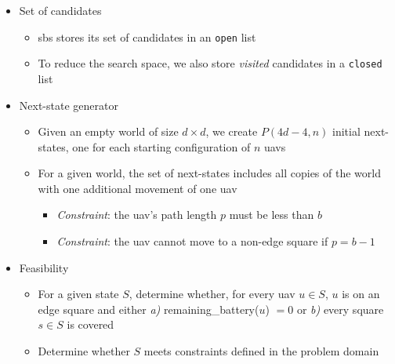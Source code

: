 \documentclass[../main.tex]{subfiles}
\begin{document}
\begin{itemize}
    \item Set of candidates
    \begin{itemize}
        \item \ac{sbs} stores its set of candidates in an \texttt{open} list
        \item To reduce the search space, we also store \textit{visited} candidates in a \texttt{closed} list
    \end{itemize}
    
    \item Next-state generator
    \begin{itemize}
        \item Given an empty world of size $d\times d$, we create $P(4d-4,n)$ initial next-states, one for each starting configuration of $n$ \acp{uav}
        \item For a given world, the set of next-states includes all copies of the world with one additional movement of one \ac{uav}
        \begin{itemize}
            \item \textit{Constraint}: the \ac{uav}'s path length $p$ must be less than $b$
            \item \textit{Constraint}: the \ac{uav} cannot move to a non-edge square if $p=b-1$
        \end{itemize}
    
    \end{itemize}
    
    \item Feasibility
    \begin{itemize}
        \item For a given state $S$, determine whether, for every \ac{uav} $u\in S$, $u$ is on an edge square and either \textit{a)} remaining\_battery($u$) $=0$ or \textit{b)} every square $s\in S$ is covered
        \item Determine whether $S$ meets constraints defined in the problem domain
    \end{itemize}


\end{itemize}
\end{document}
